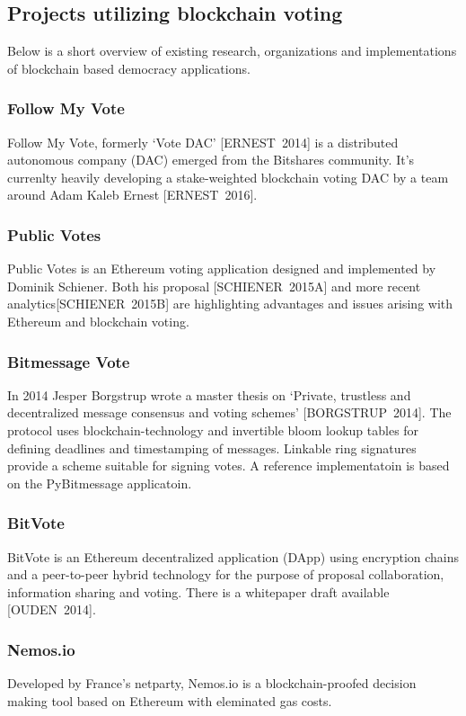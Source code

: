 \documentclass[9pt,oneside]{amsart}
\begin{document}
\begin{multicols}{2}
\subsection{Projects utilizing blockchain voting}
Below is a short overview of existing research, organizations and implementations of blockchain based democracy applications.

\subsubsection{Follow My Vote}
Follow My Vote, formerly \enquote*{Vote DAC} [ERNEST~2014] is a distributed autonomous company (DAC) emerged from the Bitshares community. It's currenlty heavily developing a stake-weighted blockchain voting DAC by a team around Adam Kaleb Ernest [ERNEST~2016].
\subsubsection{Public Votes}
Public Votes is an Ethereum voting application designed and implemented by Dominik Schiener. Both his proposal [SCHIENER~2015A] and more recent analytics[SCHIENER~2015B] are highlighting advantages and issues arising with Ethereum and blockchain voting.
\subsubsection{Bitmessage Vote}
In 2014 Jesper Borgstrup wrote a master thesis on \enquote*{Private, trustless and decentralized message consensus and voting schemes} [BORGSTRUP~2014]. The protocol uses blockchain-technology and invertible bloom lookup tables for defining deadlines and timestamping of messages. Linkable ring signatures provide a scheme suitable for signing votes. A reference implementatoin is based on the PyBitmessage applicatoin.
\subsubsection{BitVote}
BitVote is an Ethereum decentralized application (DApp) using encryption chains and a peer-to-peer hybrid technology for the purpose of proposal collaboration, information sharing and voting. There is a whitepaper draft available [OUDEN~2014].
\subsubsection{Nemos.io}
Developed by France's netparty, Nemos.io is a blockchain-proofed decision making tool based on Ethereum with eleminated gas costs.

\end{multicols}
\end{document}
